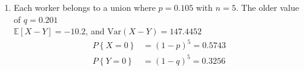 \begin{enumerate}
\begin{subequations}
\begin{enumerate}
			\item 
			\begin{align}
				P \left\{B > 500 \right\} &= P \left\{Z > \frac{500 - 704}{\sqrt{208.384}} \right\} \nonumber \\
				&= 1 - \Phi \left( \frac{500 - 704}{\sqrt{208.384}} \right) \approx 1
			\end{align}
		
			\item 
			\begin{align}
				P \left\{C > 500 \right\} &= P \left\{Z > \frac{500 - 458}{\sqrt{248.236}} \right\} \nonumber \\
				&= 1 - \Phi \left( \frac{500 - 458}{\sqrt{248.236}} \right) = 0.00384 \nonumber \\
				P\left\{ \text{required} \right\} &= 0.00384 * 1 = 0.00384
			\end{align}
		
			\item 
			\begin{align}
				P \left\{D < 250 \right\} &= P \left\{Z < \frac{250 - 293}{\sqrt{207.151}} \right\} \nonumber \\
				&= \Phi \left( \frac{250 - 293}{\sqrt{207.151}} \right) = 0.0014
			\end{align}
		
			\item 
			\begin{align}
				P \left\{E \geq 200 \right\} &= P \left\{Z \geq \frac{200 - 149}{\sqrt{126.799}} \right\} \nonumber \\
				&= 1 - \Phi \left( \frac{200 - 149}{\sqrt{126.799}} \right) \approx 0
			\end{align}
		
			\item Let $ F = F_1 - F_2 $, with $ \mathbb{E}[F] = 31$, $ \mathrm{Var}[F] = 253.819$
			\begin{align}
				P \left\{F_1 - F_2 \geq 0 \right\} &= P \left\{Z \geq \frac{0 - 31}{\sqrt{253.819}} \right\} \nonumber \\
				&= 1 - \Phi \left( \frac{0 - 31}{\sqrt{253.819}} \right) = 0.9742
			\end{align}
			
		\end{enumerate}
	\end{subequations}

	\item Each worker belongs to a union where $ p = 0.105 $ with $ n = 5 $. The older value of $ q = 0.201 $\\
	$ \mathbb{E}[X-Y] = -10.2 $, and $\mathrm{Var}(X-Y) = 147.4452$\\
	\begin{subequations}
		\begin{align}
			P \left\{X = 0 \right\} &= (1-p)^5 = 0.5743 \\
			P \left\{Y = 0 \right\} &= (1-q)^5 = 0.3256
		\end{align}
	\end{subequations}


\end{enumerate}

